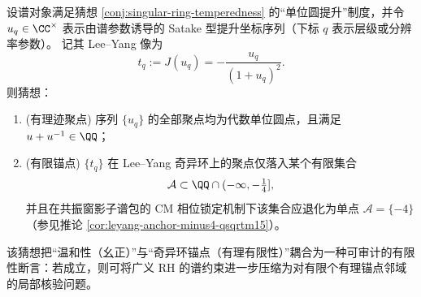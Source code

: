 \begin{conjecture}\label{conj:singular-ring-finite-anchors}
设谱对象满足猜想 \ref{conj:singular-ring-temperedness} 的“单位圆提升”制度，并令 \(u_q\in\CC^{\times}\) 表示由谱参数诱导的 Satake 型提升坐标序列（下标 \(q\) 表示层级或分辨率参数）。
记其 Lee--Yang 像为
\[
t_q:=J(u_q)=-\frac{u_q}{(1+u_q)^2}.
\]
则猜想：
\begin{enumerate}
  \item \textup{(有理迹聚点)} 序列 \(\{u_q\}\) 的全部聚点均为代数单位圆点，且满足
  \(
  u+u^{-1}\in\QQ
  \)；
  \item \textup{(有限锚点)} \(\{t_q\}\) 在 Lee--Yang 奇异环上的聚点仅落入某个有限集合
  \[
  \mathcal A\subset \QQ\cap(-\infty,-\tfrac14],
  \]
  并且在共振窗影子谱包的 CM 相位锁定机制下该集合应退化为单点 \(\mathcal A=\{-4\}\)（参见推论 \ref{cor:leyang-anchor-minus4-qsqrtm15}）。
\end{enumerate}
该猜想把“温和性（幺正）”与“奇异环锚点（有理有限性）”耦合为一种可审计的有限性断言：若成立，则可将广义 RH 的谱约束进一步压缩为对有限个有理锚点邻域的局部核验问题。
\end{conjecture}

\endinput

